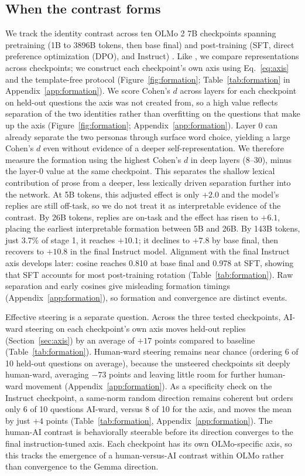 \subsection{When the contrast forms}

We track the identity contrast across ten OLMo 2 7B checkpoints spanning
pretraining (1B to 3896B tokens, then base final) and post-training (SFT, direct
preference optimization (DPO), and Instruct) \citep{olmo2}. Like
\citet{bayazit2025crosscoding}, we compare representations across checkpoints; we construct each
checkpoint's own axis using Eq.~\eqref{eq:axis} and the template-free protocol
(Figure~\ref{fig:formation}; Table~\ref{tab:formation} in
Appendix~\ref{app:formation}). We score Cohen's $d$ across layers for each
checkpoint on held-out questions the axis was not created from, so a high
value reflects separation of the two identities rather than overfitting on
the questions that make up the axis (Figure~\ref{fig:formation};
Appendix~\ref{app:formation}). Layer 0 can already separate the two personas
through surface word choice, yielding a large Cohen's $d$ even without evidence of
a deeper self-representation. We therefore measure the formation using the
highest Cohen's $d$ in deep layers (8--30), minus the layer-0 value at the
same checkpoint. This separates the shallow lexical contribution of prose
from a deeper, less lexically driven separation further into the network. At 5B
tokens, this adjusted effect is only $+2.0$ and the model's replies are still
off-task, so we do not treat it as interpretable evidence of the contrast. By
26B tokens, replies are on-task and the effect has risen to $+6.1$, placing
the earliest interpretable formation between 5B and 26B. By 143B tokens, just
3.7\% of stage 1, it reaches $+10.1$; it declines to $+7.8$ by base final,
then recovers to $+10.8$ in the final Instruct model. Alignment with the final
Instruct axis develops later: cosine reaches 0.810 at
base final and 0.978 at SFT, showing that SFT accounts for most post-training
rotation (Table~\ref{tab:formation}). Raw separation and early cosines give
misleading formation timings (Appendix~\ref{app:formation}), so formation and
convergence are distinct events.

Effective steering is a separate question. Across the three tested
checkpoints, AI-ward steering on each checkpoint's own axis moves held-out
replies (Section~\ref{sec:axis}) by an average of $+17$ points compared to
baseline (Table~\ref{tab:formation}). Human-ward steering remains near chance
(ordering 6 of 10 held-out questions on average), because the unsteered checkpoints
sit deeply human-ward, averaging $-73$ points and leaving little room for further
human-ward movement (Appendix~\ref{app:formation}). As a specificity check on the
Instruct checkpoint, a same-norm random direction remains coherent but orders only 6 of 10
questions AI-ward, versus 8 of 10 for the axis, and moves the mean by just $+4$ points
(Table~\ref{tab:formation}, Appendix~\ref{app:formation}). The human-AI contrast is
behaviorally steerable before its direction converges to the final
instruction-tuned axis. Each checkpoint has its own OLMo-specific axis, so
this tracks the emergence of a human-versus-AI contrast within OLMo rather
than convergence to the Gemma direction.

